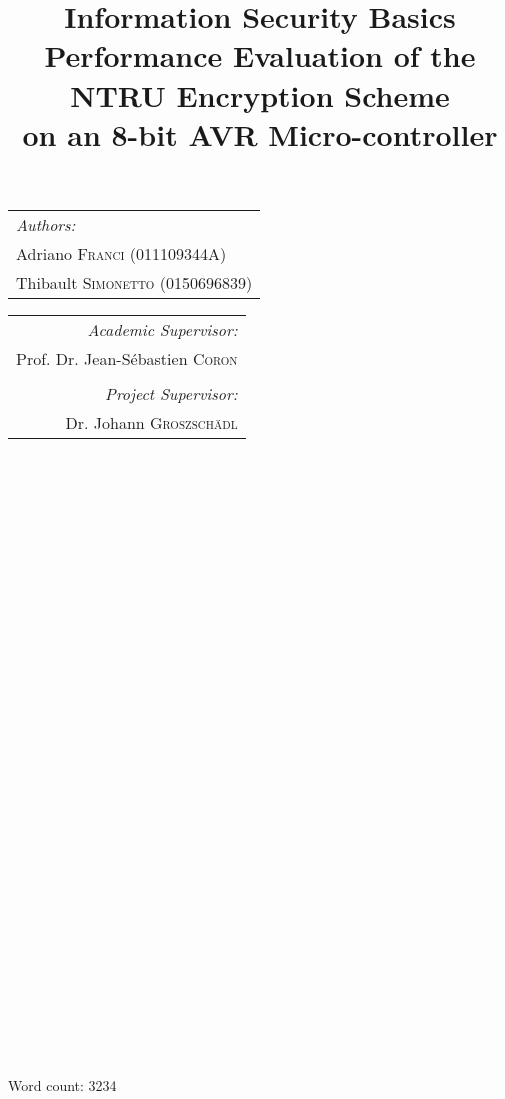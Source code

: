 \documentclass[11pt,a4paper]{article}
\begin{document}
\title{Information Security Basics\\Performance Evaluation of the NTRU Encryption Scheme\\ on an 8-bit AVR 
Micro-controller}
\maketitle

\begin{tabular}[t]{@{}l} 
	\textit{Authors:}\\
	Adriano \textsc{Franci} (011109344A)\\
	Thibault \textsc{Simonetto} (0150696839)
\end{tabular}
\hfill
\begin{tabular}[t]{r@{}}
	\textit{Academic Supervisor:}\\
	Prof. Dr. Jean-S\'ebastien \textsc{Coron}\\
	\vspace{1em}\\
	\textit{Project Supervisor:}\\
	Dr. Johann \textsc{Groszsch\"adl}\\
\end{tabular}\\\\\\\\\\\\\\\\\\\\\\\\\\\\\\\\\\\\\\\\\\\\\\\\\\\\\\\\\\\\\\
\begin{center}
	Word count: 3234
\end{center}












\end{document}
